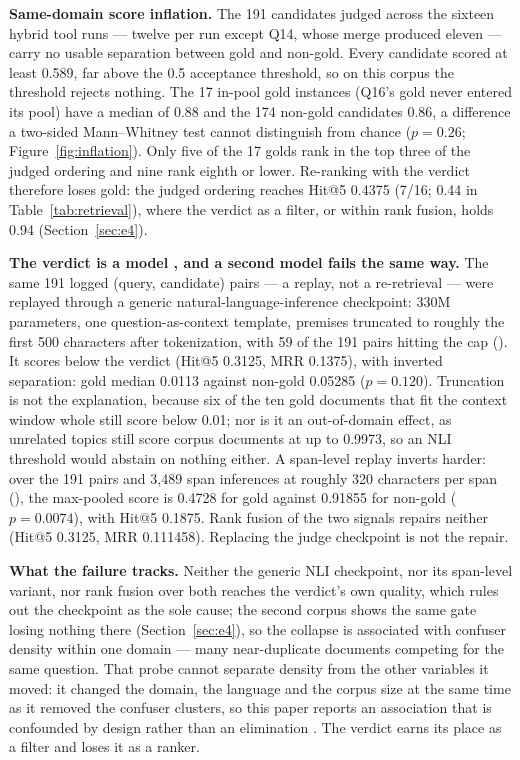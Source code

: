 \textbf{Same-domain score inflation.}
The 191 candidates judged across the sixteen hybrid tool runs --- twelve
per run except Q14, whose merge produced eleven --- carry no usable
separation between gold and non-gold. Every candidate scored at least
0.589, far above the 0.5 acceptance threshold, so on this corpus the
threshold rejects nothing. The 17 in-pool gold instances (Q16's gold never
entered its pool) have a median of 0.88 and the 174 non-gold candidates
0.86, a difference a two-sided Mann--Whitney test cannot distinguish from
chance ($p = 0.26$; Figure~\ref{fig:inflation}). Only five of the 17 golds rank in the top three of
the judged ordering and nine rank eighth or lower. Re-ranking with the
verdict therefore loses gold: the judged ordering reaches Hit@5 0.4375
(7/16; 0.44 in Table~\ref{tab:retrieval}), where the verdict as a filter,
or within rank fusion, holds 0.94 (Section~\ref{sec:e4}).

\textbf{The verdict is a model \cite{laya}, and a second model fails the
same way.}
The same 191 logged (query, candidate) pairs --- a replay, not a
re-retrieval --- were replayed through a generic natural-language-inference
checkpoint: 330M parameters, one question-as-context template, premises
truncated to roughly the first 500 characters after tokenization, with 59
of the 191 pairs hitting the cap
(). It scores
below the verdict (Hit@5
0.3125, MRR 0.1375), with inverted separation: gold median 0.0113 against
non-gold 0.05285 ($p = 0.120$). Truncation is not the explanation,
because six of the ten gold documents that fit the context window whole
still score below 0.01; nor is it an out-of-domain effect, as unrelated
topics still score corpus documents at up to 0.9973, so an NLI threshold
would abstain on nothing either. A span-level replay inverts harder: over
the 191 pairs and 3{,}489 span inferences at roughly 320 characters per
span (), the max-pooled score is 0.4728 for gold against 0.91855 for non-gold
($p = 0.0074$), with Hit@5 0.1875. Rank fusion of the two signals repairs
neither (Hit@5 0.3125, MRR 0.111458). Replacing the judge checkpoint is
not the repair.

\textbf{What the failure tracks.}
Neither the generic NLI checkpoint, nor its span-level variant, nor rank
fusion over both reaches the verdict's own quality, which rules out the
checkpoint as the sole cause; the second corpus shows
the same gate losing nothing there (Section~\ref{sec:e4}), so the collapse
is associated with confuser density within one domain --- many
near-duplicate documents competing for the same question. That probe cannot
separate density from the other variables it moved: it changed the domain,
the language and the corpus size at the same time as it removed the
confuser clusters, so this paper reports an association that is confounded
by design rather than an elimination
\cite{zheng-llmjudge,panickssery-selfpref,lightman-verify,yin-knowwhat}.
The verdict earns its place as a filter and loses it as a ranker.

